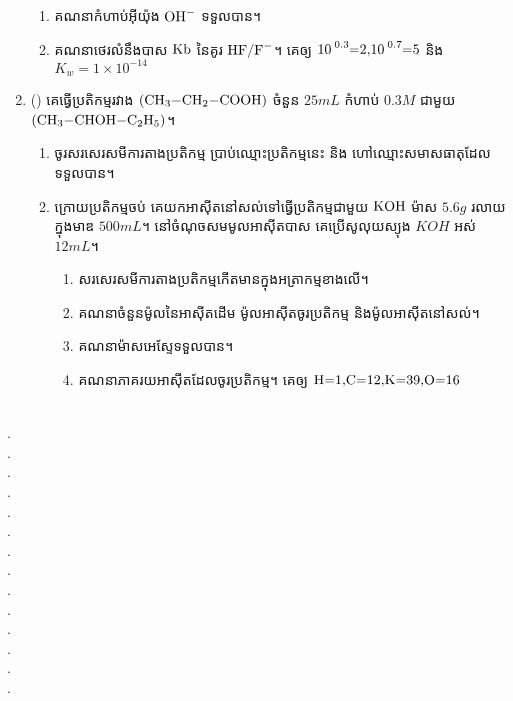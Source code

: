 \documentclass{officialexam}
\begin{document}
\begin{enumerate}[I]
	\begin{enumerate}[k]
		\item គណនាកំហាប់អុីយ៉ុង $\ce{OH-}$ ទទួលបាន។
		\item គណនាថេរលំនឹងបាស $\ce{Kb}$ នៃគូរ $\ce{HF/F^{-}}$។ គេឲ្យ $\ce{10^{0.3}=2, 10^{0.7}=5}$ និង $K_w=1 \times10^{-14}$
	\end{enumerate}
	\item {\color{khtug}()} គេធ្វើប្រតិកម្មរវាង $\left(\ce{CH3-CH2-COOH}\right)$ ចំនួន $25mL$ កំហាប់ $0.3M$ ជាមួយ $\left(\ce{CH3-CHOH-C2H5}\right)$។
	\begin{enumerate}[m]
		\item ចូរសរសេរសមីការតាងប្រតិកម្ម​ ប្រាប់ឈ្មោះប្រតិកម្មនេះ និង ហៅឈ្មោះសមាសធាតុដែលទទួលបាន។
		\item ក្រោយប្រតិកម្មចប់ គេយកអាសុីតនៅសល់ទៅធ្វើប្រតិកម្មជាមួយ $\ce{KOH}$ ម៉ាស $5.6g$ រលាយក្នុងមាឌ $500mL$។ នៅចំណុចសមមូលអាសុីតបាស គេប្រើសូលុយស្យុង $KOH$ អស់ $12mL$។
		\begin{enumerate}[k]
			\item សរសេរសមីការតាងប្រតិកម្មកើតមានក្នុងអត្រាកម្មខាងលើ។
			\item គណនាចំនួនម៉ូលនៃអាសុីតដើម ម៉ូលអាសុីតចូរប្រតិកម្ម និងម៉ូលអាសុីតនៅសល់។
			\item គណនាម៉ាសអេស្ទែទទួលបាន។
			\item គណនាភាគរយអាសុីតដែលចូរប្រតិកម្ម។ គេឲ្យ $\ce{H=1, C=12, K=39, O=16}$
		\end{enumerate}
	\end{enumerate}
\end{enumerate}\newpage
{}\\
{\color{white}.}\dotfill\\
{\color{white}.}\dotfill\\
{\color{white}.}\dotfill
\\
{\color{white}.}\dotfill\\
{\color{white}.}\dotfill\\
{\color{white}.}\dotfill
\\
{\color{white}.}\dotfill\\
{\color{white}.}\dotfill\\
{\color{white}.}\dotfill
\\
{\color{white}.}\dotfill\\
{\color{white}.}\dotfill\\
{\color{white}.}\dotfill
\\
{\color{white}.}\dotfill\\
{\color{white}.}\dotfill\\
\end{document}
